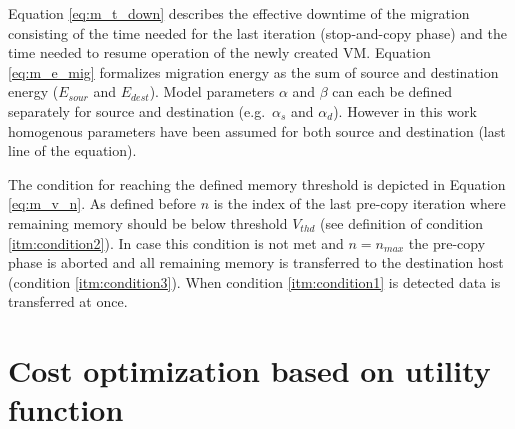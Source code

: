 Equation \ref{eq:m_t_down} describes the effective downtime of the migration consisting of the time needed for the last iteration (stop-and-copy phase) and the time needed to resume operation of the newly created VM. Equation \ref{eq:m_e_mig} formalizes migration energy as the sum of source and destination energy ($E_{sour}$ and $E_{dest}$). Model parameters $\alpha$ and $\beta$ can each be defined separately for source and destination (e.g.~$\alpha_s$ and $\alpha_d$). However in this work homogenous parameters have been assumed for both source and destination (last line of the equation). 

The condition for reaching the defined memory threshold is depicted in Equation \ref{eq:m_v_n}. As defined before $n$ is the index of the last pre-copy iteration where remaining memory should be below threshold $V_{thd}$ (see definition of condition \ref{itm:condition2}). In case this condition is not met and $n = n_{max}$ the pre-copy phase is aborted and all remaining memory is transferred to the destination host (condition \ref{itm:condition3}). When condition \ref{itm:condition1} is detected data is transferred at once. 



\section{Cost optimization based on utility function}


